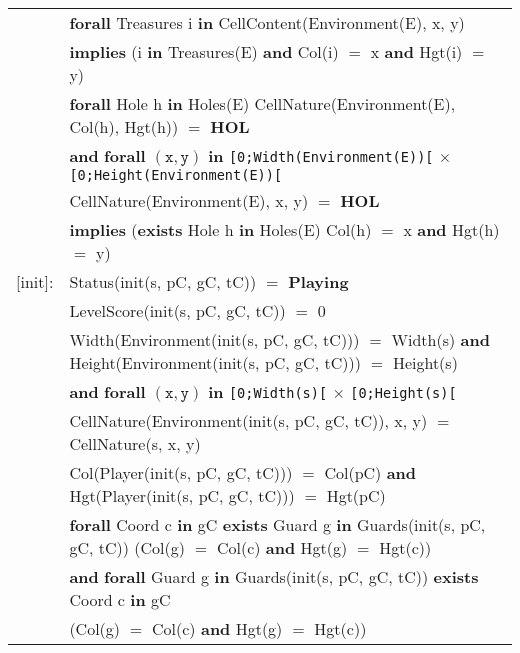 \documentclass[8pt]{article}
\begin{document}
{\begin{longtable}{rl}
  & \quad\quad\quad\quad \textbf{forall} \textrm{Treasures} i \textbf{in} \textrm{CellContent(Environment(E), x, y)} \\
  & \quad\quad\quad\quad\quad\quad \textbf{implies} (i \textbf{in} \textrm{Treasures(E)} \textbf{and} \textrm{Col(i)} $=$ x \textbf{and} \textrm{Hgt(i)} $=$ y)\\
  & \textbf{forall} \textrm{Hole} h \textbf{in} \textrm{Holes(E)} CellNature(Environment(E), Col(h), Hgt(h)) $=$ \textbf{HOL}\\
  & \quad\quad \textbf{and} \textbf{forall} $(\mathtt{x},\mathtt{y})$ \textbf{in} \texttt{[0;Width(Environment(E))[} $\times$ \texttt{[0;Height(Environment(E))[}\\
  & \quad\quad\quad\quad \textrm{CellNature(Environment(E), x, y)} $=$ \textbf{HOL}\\
  & \quad\quad\quad\quad\quad\quad \textbf{implies} (\textbf{exists} \textrm{Hole} h \textbf{in} \textrm{Holes(E)} \textrm{Col(h)} $=$ x \textbf{and} \textrm{Hgt(h)} $=$ y)\\
  \textrm{[init]}:& \textrm{Status(init(s, pC, gC, tC))} $=$ \textbf{Playing}\\
  & \textrm{LevelScore(init(s, pC, gC, tC))} $=$ 0\\
  & \textrm{Width(Environment(init(s, pC, gC, tC)))} $=$ \textrm{Width(s)} \textbf{and} \textrm{Height(Environment(init(s, pC, gC, tC)))} $=$ \textrm{Height(s)} \\
  & \quad\quad \textbf{and} \textbf{forall} $(\mathtt{x},\mathtt{y})$ \textbf{in} \texttt{[0;Width(s)[} $\times$ \texttt{[0;Height(s)[}\\
  & \quad\quad\quad\quad \textrm{CellNature(Environment(init(s, pC, gC, tC)), x, y)} $=$ \textrm{CellNature(s, x, y)}\\
  & \textrm{Col(Player(init(s, pC, gC, tC)))} $=$ \textrm{Col(pC)} \textbf{and} \textrm{Hgt(Player(init(s, pC, gC, tC)))} $=$ \textrm{Hgt(pC)}\\
  & \textbf{forall} \textrm{Coord} c \textbf{in} gC \textbf{exists} \textrm{Guard} g \textbf{in} \textrm{Guards(init(s, pC, gC, tC))} (\textrm{Col(g)} $=$ \textrm{Col(c)} \textbf{and} \textrm{Hgt(g)} $=$ \textrm{Hgt(c)})\\
  & \quad\quad \textbf{and} \textbf{forall} \textrm{Guard} g \textbf{in} \textrm{Guards(init(s, pC, gC, tC))} \textbf{exists} \textrm{Coord} c \textbf{in} gC\\
  & \quad\quad\quad\quad (\textrm{Col(g)} $=$ \textrm{Col(c)} \textbf{and} \textrm{Hgt(g)} $=$ \textrm{Hgt(c)})\\

\end{longtable}}
\end{document}
